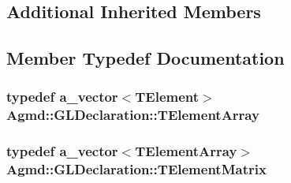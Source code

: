 \subsection*{Additional Inherited Members}


\subsection{Member Typedef Documentation}
\hypertarget{class_agmd_1_1_g_l_declaration_ac27d21b565226320017925e6d79cf5ec}{
\subsubsection[{T\+Element\+Array}]{\setlength{\rightskip}{0pt plus 5cm}typedef {\bf a\+\_\+vector}$<${\bf T\+Element}$>$ {\bf Agmd\+::\+G\+L\+Declaration\+::\+T\+Element\+Array}}}\label{class_agmd_1_1_g_l_declaration_ac27d21b565226320017925e6d79cf5ec}
\hypertarget{class_agmd_1_1_g_l_declaration_a8efdeef74a5b78ebe90c301ba7a3331f}{
\subsubsection[{T\+Element\+Matrix}]{\setlength{\rightskip}{0pt plus 5cm}typedef {\bf a\+\_\+vector}$<${\bf T\+Element\+Array}$>$ {\bf Agmd\+::\+G\+L\+Declaration\+::\+T\+Element\+Matrix}}}\label{class_agmd_1_1_g_l_declaration_a8efdeef74a5b78ebe90c301ba7a3331f}


